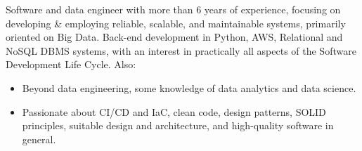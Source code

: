 
\begin{cvparagraph}

Software and data engineer with more than 6 years of experience, focusing on developing & employing reliable, scalable, and maintainable systems, primarily oriented on Big Data. Back-end development in Python, AWS, Relational and NoSQL DBMS systems, with an interest in practically all aspects of the Software Development Life Cycle. Also:

\begin{itemize}
    
    \item Beyond data engineering, some knowledge of data analytics and data science.

    \item Passionate about CI/CD and IaC, clean code, design patterns, SOLID principles, suitable design and architecture, and high-quality software in general.

\end{itemize}
\end{cvparagraph}
